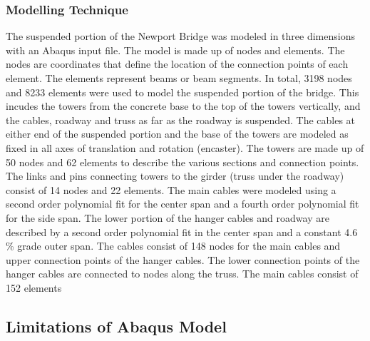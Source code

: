 \subsubsection{Modelling Technique}

The suspended portion of the Newport Bridge was modeled in three dimensions with an Abaqus input file. 
The model is made up of nodes and elements. The nodes are coordinates that define the location of the connection points of each element. 
The elements represent beams or beam segments. In total, 3198 nodes and 8233 elements were used to model the suspended portion of the bridge. 
This incudes the towers from the concrete base to the top of the towers vertically, and the cables, roadway and truss as far as the roadway is suspended. 
The cables at either end of the suspended portion and the base of the towers are modeled as fixed in all axes of translation and rotation (encaster).
The towers are made up of 50 nodes and 62 elements to describe the various sections and connection points. 
The links and pins connecting towers to the girder (truss under the roadway) consist of 14 nodes and 22 elements. 
The main cables were modeled using a second order polynomial fit for the center span and a fourth order polynomial fit for the side span. 
The lower portion of the hanger cables and roadway are described by a second order polynomial fit in the center span and a constant 4.6 \% grade outer span. 
The cables consist of 148 nodes for the main cables and upper connection points of the hanger cables.
The lower connection points of the hanger cables are connected to nodes along the truss. The main cables consist of 152 elements 


\subsection{Limitations of Abaqus Model}

